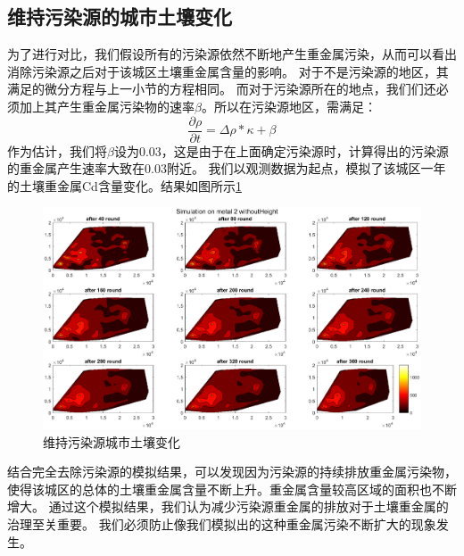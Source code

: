 \documentclass[a4paper]{article}
\begin{document}
\subsection{维持污染源的城市土壤变化}
为了进行对比，我们假设所有的污染源依然不断地产生重金属污染，从而可以看出消除污染源之后对于该城区土壤重金属含量的影响。
对于不是污染源的地区，其满足的微分方程与上一小节的方程相同。
而对于污染源所在的地点，我们们还必须加上其产生重金属污染物的速率$\beta$。所以在污染源地区，需满足：
\begin{equation}
 \frac{\partial \rho}{\partial t}= \Delta \rho * \kappa + \beta
\end{equation}
作为估计，我们将$\beta$设为0.03，这是由于在上面确定污染源时，计算得出的污染源的重金属产生速率大致在0.03附近。
我们以观测数据为起点，模拟了该城区一年的土壤重金属Cd含量变化。结果如图所示\ref{fig:pollution-without-height}
\begin{figure}[H]
    \centerline{
    \includegraphics[scale=0.5]{pictures/pollution-without-height.eps}}
    \caption{维持污染源城市土壤变化}
    \label{fig:pollution-without-height}
\end{figure}
\indent 结合完全去除污染源的模拟结果，可以发现因为污染源的持续排放重金属污染物，
使得该城区的总体的土壤重金属含量不断上升。重金属含量较高区域的面积也不断增大。
通过这个模拟结果，我们认为减少污染源重金属的排放对于土壤重金属的治理至关重要。
我们必须防止像我们模拟出的这种重金属污染不断扩大的现象发生。
\end{document}
